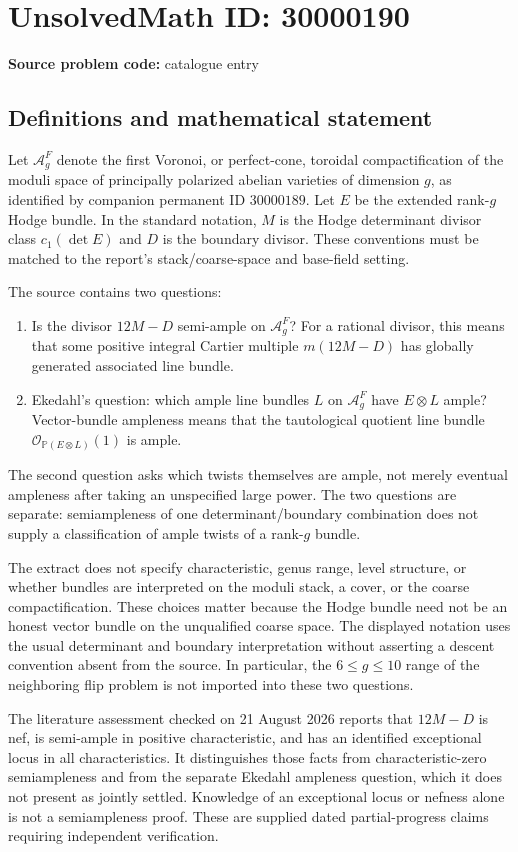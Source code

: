 \documentclass[11pt]{article}
\begin{document}
\section*{UnsolvedMath ID: 30000190}
\textbf{Source problem code:} catalogue entry
\subsection{Definitions and mathematical statement}
Let $\mathcal A_g^F$ denote the first Voronoi, or perfect-cone, toroidal compactification of the moduli space of principally polarized abelian varieties of dimension $g$, as identified by companion permanent ID $30000189$. Let $E$ be the extended rank-$g$ Hodge bundle. In the standard notation, $M$ is the Hodge determinant divisor class $c_1(\det E)$ and $D$ is the boundary divisor. These conventions must be matched to the report's stack/coarse-space and base-field setting.

The source contains two questions:
\begin{enumerate}
\item Is the divisor $12M-D$ semi-ample on $\mathcal A_g^F$? For a rational divisor, this means that some positive integral Cartier multiple $m(12M-D)$ has globally generated associated line bundle.
\item Ekedahl's question: which ample line bundles $L$ on $\mathcal A_g^F$ have $E\otimes L$ ample? Vector-bundle ampleness means that the tautological quotient line bundle $\mathcal O_{\mathbb P(E\otimes L)}(1)$ is ample.
\end{enumerate}
The second question asks which twists themselves are ample, not merely eventual ampleness after taking an unspecified large power. The two questions are separate: semiampleness of one determinant/boundary combination does not supply a classification of ample twists of a rank-$g$ bundle.

The extract does not specify characteristic, genus range, level structure, or whether bundles are interpreted on the moduli stack, a cover, or the coarse compactification. These choices matter because the Hodge bundle need not be an honest vector bundle on the unqualified coarse space. The displayed notation uses the usual determinant and boundary interpretation without asserting a descent convention absent from the source. In particular, the $6\le g\le10$ range of the neighboring flip problem is not imported into these two questions.

The literature assessment checked on 21 August 2026 reports that $12M-D$ is nef, is semi-ample in positive characteristic, and has an identified exceptional locus in all characteristics. It distinguishes those facts from characteristic-zero semiampleness and from the separate Ekedahl ampleness question, which it does not present as jointly settled. Knowledge of an exceptional locus or nefness alone is not a semiampleness proof. These are supplied dated partial-progress claims requiring independent verification.
\end{document}
